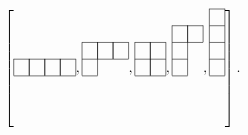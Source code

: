 \begin{align*}  
\left[{\def\lr#1{\multicolumn{1}{|@{\hspace{.6ex}}c@{\hspace{.6ex}}|}{\raisebox{-.3ex}{$#1$}}}
\raisebox{-.6ex}{$\begin{array}[b]{*{4}c}\cline{1-4}
\lr{\phantom{x}}&\lr{\phantom{x}}&\lr{\phantom{x}}&\lr{\phantom{x}}\\\cline{1-4}
\end{array}$}
}, {\def\lr#1{\multicolumn{1}{|@{\hspace{.6ex}}c@{\hspace{.6ex}}|}{\raisebox{-.3ex}{$#1$}}}
\raisebox{-.6ex}{$\begin{array}[b]{*{3}c}\cline{1-3}
\lr{\phantom{x}}&\lr{\phantom{x}}&\lr{\phantom{x}}\\\cline{1-3}
\lr{\phantom{x}}\\\cline{1-1}
\end{array}$}
}, {\def\lr#1{\multicolumn{1}{|@{\hspace{.6ex}}c@{\hspace{.6ex}}|}{\raisebox{-.3ex}{$#1$}}}
\raisebox{-.6ex}{$\begin{array}[b]{*{2}c}\cline{1-2}
\lr{\phantom{x}}&\lr{\phantom{x}}\\\cline{1-2}
\lr{\phantom{x}}&\lr{\phantom{x}}\\\cline{1-2}
\end{array}$}
}, {\def\lr#1{\multicolumn{1}{|@{\hspace{.6ex}}c@{\hspace{.6ex}}|}{\raisebox{-.3ex}{$#1$}}}
\raisebox{-.6ex}{$\begin{array}[b]{*{2}c}\cline{1-2}
\lr{\phantom{x}}&\lr{\phantom{x}}\\\cline{1-2}
\lr{\phantom{x}}\\\cline{1-1}
\lr{\phantom{x}}\\\cline{1-1}
\end{array}$}
}, {\def\lr#1{\multicolumn{1}{|@{\hspace{.6ex}}c@{\hspace{.6ex}}|}{\raisebox{-.3ex}{$#1$}}}
\raisebox{-.6ex}{$\begin{array}[b]{*{1}c}\cline{1-1}
\lr{\phantom{x}}\\\cline{1-1}
\lr{\phantom{x}}\\\cline{1-1}
\lr{\phantom{x}}\\\cline{1-1}
\lr{\phantom{x}}\\\cline{1-1}
\end{array}$}
}\right]
.\end{align*}

